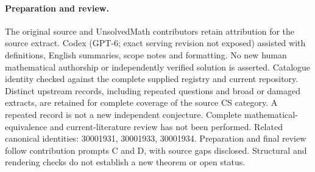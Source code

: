 \documentclass[11pt]{article}
\begin{document}
\paragraph{Preparation and review.}
The original source and UnsolvedMath contributors retain attribution for the source extract. Codex (GPT-6; exact serving revision not exposed) assisted with definitions, English summaries, scope notes and formatting. No new human mathematical authorship or independently verified solution is asserted. Catalogue identity checked against the complete supplied registry and current repository. Distinct upstream records, including repeated questions and broad or damaged extracts, are retained for complete coverage of the source CS category. A repeated record is not a new independent conjecture. Complete mathematical-equivalence and current-literature review has not been performed. Related canonical identities: 30001931, 30001933, 30001934. Preparation and final review follow contribution prompts C and D, with source gaps disclosed. Structural and rendering checks do not establish a new theorem or open status.
\label{end:statement}
\end{document}
